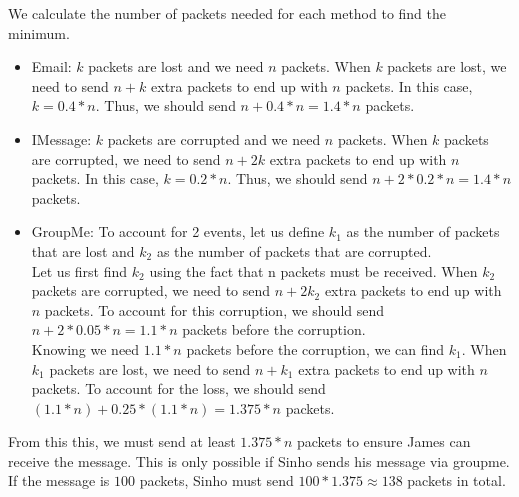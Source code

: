 \documentclass{article}
\begin{document}
    \noindent
    We calculate the number of packets needed for each method to find the minimum.
        \begin{itemize}
            \item Email: $k$ packets are lost and we need $n$ packets. When $k$ packets are lost, we need to send $n + k$ extra packets to end up with $n$ packets. In this case, $k = 0.4 * n$. Thus, we should send $n + 0.4 * n = 1.4 * n$ packets.
            \item IMessage: $k$ packets are corrupted and we need $n$ packets. When $k$ packets are corrupted, we need to send $n + 2k$ extra packets to end up with $n$ packets. In this case, $k = 0.2 * n$. Thus, we should send $n + 2 * 0.2 * n = 1.4 * n$ packets.
            \item GroupMe: To account for 2 events, let us define $k_1$ as the number of packets that are lost and $k_2$ as the number of packets that are corrupted.\\
            Let us first find $k_2$ using the fact that n packets must be received. When $k_2$ packets are corrupted, we need to send $n + 2k_2$ extra packets to end up with $n$ packets. To account for this corruption, we should send $n + 2 * 0.05 * n = 1.1 * n$ packets before the corruption. \\
            Knowing we need $1.1 * n$ packets before the corruption, we can find $k_1$. When $k_1$ packets are lost, we need to send $n + k_1$ extra packets to end up with $n$ packets. To account for the loss, we should send $(1.1 * n) + 0.25 * (1.1 * n) = 1.375 * n$ packets.
    	\end{itemize}
    From this this, we must send at least $1.375 * n$ packets to ensure James can receive the message. This is only possible if Sinho sends his message via groupme. \\
    If the message is $100$ packets, Sinho must send $100 * 1.375 \approx 138$ packets in total.
\end{document}
